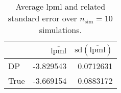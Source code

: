 \begin{table}[H]

\caption{Average lpml and related standard error over $n_{\text{sim}} = 10$ simulations.}
\centering
\begin{tabular}[t]{lrr}
\toprule
  & $\overbar{\text{lpml}}$ & $\text{sd}(\overbar{\text{lpml}})$\\
\midrule
DP & -3.829543 & 0.0712631\\
True & -3.669154 & 0.0883172\\
\bottomrule
\end{tabular}
\end{table}